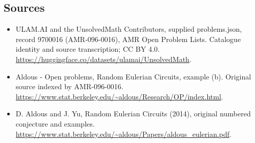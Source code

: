 \documentclass[11pt,a4paper]{article}
\begin{document}
\subsection{Sources}
\begin{itemize}
\item[S1] ULAM.AI and the UnsolvedMath Contributors, supplied problems.json, record 9700016 (AMR-096-0016), AMR Open Problem Lists. Catalogue identity and source transcription; CC BY 4.0.
\url{https://huggingface.co/datasets/ulamai/UnsolvedMath}.
\item[S2] Aldous - Open problems, Random Eulerian Circuits, example (b). Original source indexed by AMR-096-0016.
\url{https://www.stat.berkeley.edu/~aldous/Research/OP/index.html}.
\item[S3] D. Aldous and J. Yu, Random Eulerian Circuits (2014), original numbered conjecture and examples.
\url{https://www.stat.berkeley.edu/~aldous/Papers/aldous_eulerian.pdf}.
\end{itemize}
\end{document}
